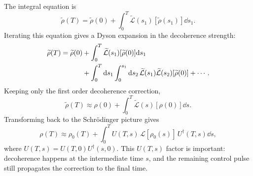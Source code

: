 \documentclass{notes2}
\begin{document}
The integral equation is
\begin{equation}
    \widetilde{\rho}(T)
    =
    \widetilde{\rho}(0)
    +
    \int_0^T
    \widetilde{\mathcal{L}}(s_1)[\widetilde{\rho}(s_1)]\dd s_1 .
\end{equation}
Iterating this equation gives a Dyson expansion in the decoherence strength:
\begin{align}
    \widetilde{\rho}(T)
    =
    \widetilde{\rho}(0)
    &+
    \int_0^T
    \widetilde{\mathcal{L}}(s_1)[\widetilde{\rho}(0)]\dd s_1
    \notag\\
    &+
    \int_0^T\dd s_1
    \int_0^{s_1}\dd s_2\,
    \widetilde{\mathcal{L}}(s_1)
    \widetilde{\mathcal{L}}(s_2)
    [\widetilde{\rho}(0)]
    + \cdots .
    \label{eq:lindblad_dyson_expansion}
\end{align}
Keeping only the first order decoherence correction,
\begin{equation}
    \widetilde{\rho}(T)
    \approx
    \rho(0)
    +
    \int_0^T
    \widetilde{\mathcal{L}}(s)[\rho(0)]\dd s .
\end{equation}
Transforming back to the Schr\"odinger picture gives
\begin{equation}
    \rho(T)
    \approx
    \rho_0(T)
    +
    \int_0^T
    U(T,s)\,
    \mathcal{L}[\rho_0(s)]\,
    U^\dagger(T,s)\dd s,
    \label{eq:first_order_lindblad_schrodinger}
\end{equation}
where $U(T,s)=U(T,0)U^\dagger(s,0)$. This $U(T,s)$ factor is important:
decoherence happens at the intermediate time $s$, and the remaining control
pulse still propagates the correction to the final time.
\end{document}
